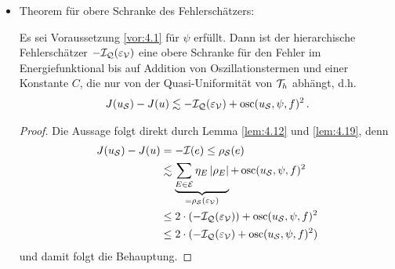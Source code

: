 \begin{itemize}
\begin{proof}
\begin{align*}
\end{align*}
wobei wir als letztes die Ungleichung von Young mit einem $\eps > 0$ verwendet haben und
\[
	\mcal E^0 = \bigcup_{p \in \mcal N}\mcal E^0_p \, , \quad \mcal E^+ = \bigcup_{p \in \mcal N} \mcal E_p^+ \, .
\] 
Wählen wir $\eps \le C$, so ergibt sich nach leichtem Umstellen der Ungleichung
\begin{align*}
	c(\eps) \rho_{\mcal S}(e) & \le \frac \eps2 \(\sum_{E\in \mcal E^+} \abs{\rho_E}^2+\osc_2(u_{\mcal S},\psi,f)^2\) + \frac 1{2\eps} \osc_1(u_{\mcal S},f)^2 + \sum_{E\in \mcal E^0} d_E \, \abs{\rho_E} \\
	& \le \(1+\frac 1{2\eps}\) \sum_{E\in \mcal E_p} \eta_E \, \abs{\rho_E}+ \(\frac\eps 2 + \frac 1{2\eps}\) \(\osc_2(u_{\mcal S},\psi,f)^2+\osc_1(u_{\mcal S},f)^2\) \\
	& \lesssim \sum_{E\in \mcal E_p} \eta_E \, \abs{\rho_E} + \osc(u_{\mcal S},\psi,f)^2 
\end{align*}
mit $c(\eps) = \eps-\frac 1{2\eps}$ und $\eta_E$ wie in \eqref{eq:4.11} definiert. Damit folgt die Behauptung.
\end{proof}




\item Theorem für obere Schranke des Fehlerschätzers:
\begin{theorem}
Es sei Voraussetzung \ref{vor:4.1} für $\psi$ erfüllt. Dann ist der hierarchische Fehlerschätzer $-\mathcal I_{\mathcal Q}(\varepsilon_{\mathcal V})$ eine obere Schranke für den Fehler im Energiefunktional bis auf Addition von Oszillationstermen und einer Konstante $C$, die nur von der Quasi-Uniformität von $\mathcal T_h$ abhängt, d.h.
\begin{align}
	J(u_{\mathcal S}) - J(u) \lesssim -\mathcal I_{\mathcal Q}(\varepsilon_{\mathcal V}) + \operatorname{osc} (u_{\mathcal S},\psi,f)^2 \, .
\end{align}
\end{theorem}

\begin{proof}
Die Aussage folgt direkt durch Lemma \ref{lem:4.12} und \ref{lem:4.19}, denn
\begin{align*}
	J(u_{\mathcal S})-J(u) & = - \mathcal I (e) \le \rho_{\mathcal S}(e) \\
	& \lesssim \underbrace{\sum_{E\in \mathcal E}\eta_E \, \lvert \rho_E\rvert}_{=\rho_{\mathcal S}(\varepsilon_{\mathcal V})} + \operatorname{osc} (u_{\mathcal S},\psi,f)^2 \\
	& \le 2\cdot (-\mathcal I_{\mathcal Q}(\varepsilon_{\mathcal V}))+ \operatorname{osc} (u_{\mathcal S},\psi,f)^2 \\
	& \le 2 \cdot (-\mathcal I_{\mathcal Q}(\varepsilon_{\mathcal V})+ \operatorname{osc} (u_{\mathcal S},\psi,f)^2)
\end{align*}
und damit folgt die Behauptung.
\end{proof}


\end{itemize}
